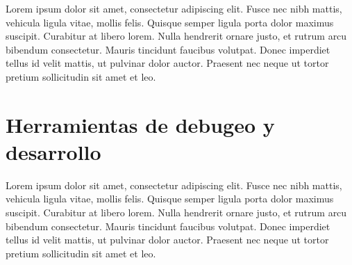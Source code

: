 Lorem ipsum dolor sit amet, consectetur adipiscing elit. Fusce nec nibh mattis, vehicula ligula vitae, mollis felis. Quisque semper ligula porta dolor maximus suscipit. Curabitur at libero lorem. Nulla hendrerit ornare justo, et rutrum arcu bibendum consectetur. Mauris tincidunt faucibus volutpat. Donec imperdiet tellus id velit mattis, ut pulvinar dolor auctor. Praesent nec neque ut tortor pretium sollicitudin sit amet et leo.

\section{Herramientas de debugeo y desarrollo}

Lorem ipsum dolor sit amet, consectetur adipiscing elit. Fusce nec nibh mattis, vehicula ligula vitae, mollis felis. Quisque semper ligula porta dolor maximus suscipit. Curabitur at libero lorem. Nulla hendrerit ornare justo, et rutrum arcu bibendum consectetur. Mauris tincidunt faucibus volutpat. Donec imperdiet tellus id velit mattis, ut pulvinar dolor auctor. Praesent nec neque ut tortor pretium sollicitudin sit amet et leo.


